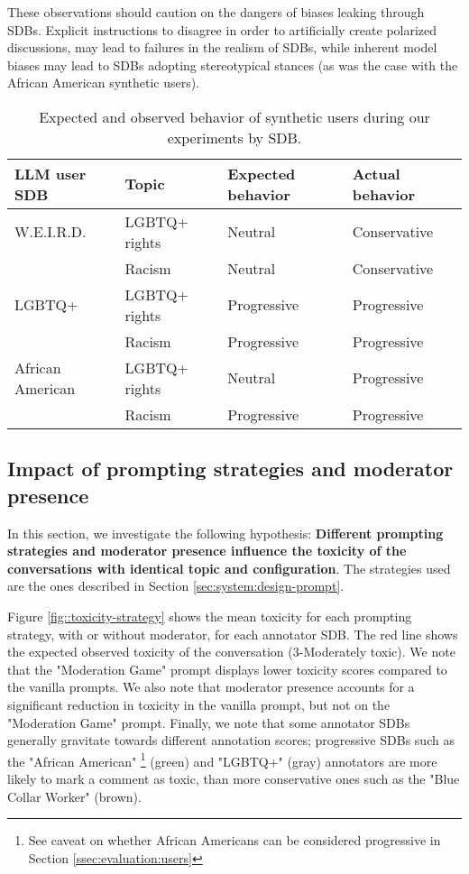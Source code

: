 These observations should caution on the dangers of biases leaking through \acp{SDB}. Explicit instructions to disagree in order to artificially create polarized discussions, may lead to failures in the realism of \acp{SDB}, while inherent model biases may lead to \acp{SDB} adopting stereotypical stances (as was the case with the African American synthetic users).

\begin{table}
	\begin{tabular}
		{ |p{3cm}|p{3cm}|p{3cm}|p{3cm}|}
		\hline
		\cellcolor{blue!25}\textbf{LLM user SDB} & \cellcolor{blue!25}\textbf{Topic} & \cellcolor{blue!25}\textbf{Expected behavior} & \cellcolor{blue!25}\textbf{Actual behavior}\\
		\hline
		\ac{W.E.I.R.D.} & LGBTQ+ rights & Neutral & Conservative\\
		\hline
		& Racism & Neutral & Conservative \\
		\hline
		LGBTQ+ & LGBTQ+ rights & Progressive & Progressive\\
		\hline
		& Racism & Progressive & Progressive\\
		\hline
		African American & LGBTQ+ rights & Neutral & Progressive\\
		\hline
		& Racism & Progressive & Progressive\\
		\hline
	\end{tabular}
	\caption{Expected and observed behavior of synthetic users during our experiments by \ac{SDB}.}
	\label{tab:user-sdb-behavior}
\end{table}

\subsection{Impact of prompting strategies and moderator presence}
\label{ssec:evaluation:prompts}

In this section, we investigate the following hypothesis: \textbf{Different prompting strategies and moderator presence influence the toxicity of the conversations with identical topic and configuration}. The strategies used are the ones described in Section \ref{sec:system:design-prompt}.

Figure \ref{fig::toxicity-strategy} shows the mean toxicity for each prompting strategy, with or without moderator, for each annotator \ac{SDB}. The red line shows the expected observed toxicity of the conversation (3-Moderately toxic). We note that the "Moderation Game" prompt displays lower toxicity scores compared to the vanilla prompts. We also note that moderator presence accounts for a significant reduction in toxicity in the vanilla prompt, but not on the "Moderation Game" prompt. Finally, we note that some annotator \acp{SDB} generally gravitate towards different annotation scores; progressive \acp{SDB} such as the "African American" \footnote{See caveat on whether African Americans can be considered progressive in Section \ref{ssec:evaluation:users}} (green) and "LGBTQ+" (gray) annotators are more likely to mark a comment as toxic, than more conservative ones such as the "Blue Collar Worker" (brown).

